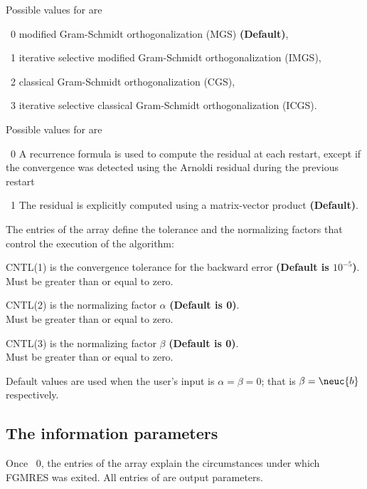 Possible values for  are 
\begin{listparam}
  \item[~0] modified Gram-Schmidt orthogonalization (MGS) {\bf (Default)},
  \item[~1] iterative selective modified Gram-Schmidt orthogonalization (IMGS),
  \item[~2] classical Gram-Schmidt orthogonalization (CGS),
  \item[~3] iterative selective classical Gram-Schmidt orthogonalization (ICGS).
\end{listparam}
Possible values for  are
\begin{listparam}
  \item[~0] A recurrence formula is used to compute the residual at each restart, except if
       the convergence was detected using the Arnoldi residual during the previous
       restart
  \item[~1] The residual is explicitly computed using a matrix-vector product {\bf (Default)}.
\end{listparam}

 
The entries of the  array define the tolerance and the
normalizing factors  that control the 
execution of the algorithm:
\begin{listparam}
 \item[CNTL(1)]  is the convergence tolerance for the backward error
      {\bf (Default is $10^{-5}$)}. \\
      Must be greater than or equal to zero.
 \item[CNTL(2)]  is the normalizing factor $\alpha$
      {\bf (Default is 0)}.  \\
      Must be greater than or equal to zero.
 \item[CNTL(3)]  is the normalizing factor $\beta$
      {\bf (Default is 0)}. \\
      Must be greater than or equal to zero.
\end{listparam}
Default values are used when the user's input
is $\alpha = \beta = 0$;
that is $\beta = \neuc{b}$ respectively.

%
%
\subsection{The information  parameters}\label{sec:infoPar}
%
Once ~0, the entries of the array  explain 
the circumstances under which FGMRES was exited.
All entries of  are output parameters. \\


